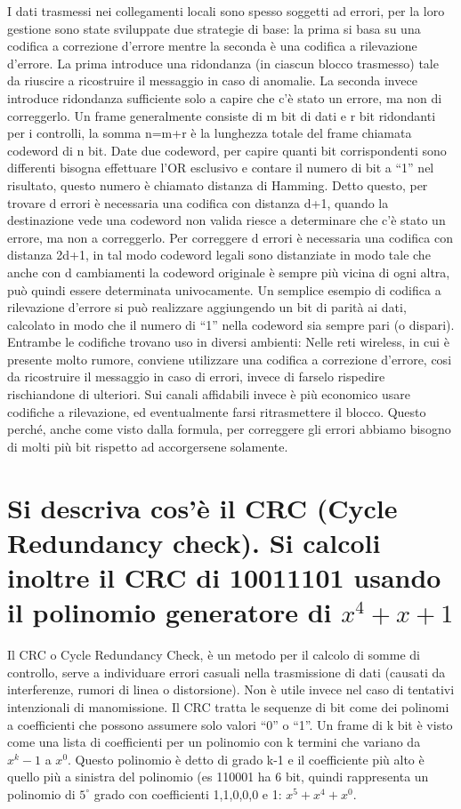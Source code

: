 I dati trasmessi nei collegamenti locali sono spesso soggetti ad errori, per la loro gestione sono state sviluppate due strategie di base: la prima si basa su una codifica a correzione d’errore mentre la seconda è una codifica a rilevazione d’errore.
La prima introduce una ridondanza (in ciascun blocco trasmesso) tale da riuscire a ricostruire il messaggio in caso di anomalie. La seconda invece introduce ridondanza sufficiente solo a capire che c’è stato un errore, ma non di correggerlo.
Un frame generalmente consiste di m bit di dati e r bit ridondanti per i controlli, la somma n=m+r è la lunghezza totale del frame chiamata codeword di n bit. Date due codeword, per capire quanti bit corrispondenti sono differenti bisogna effettuare l’OR esclusivo e contare il numero di bit a “1” nel risultato, questo numero è chiamato distanza di Hamming.
Detto questo, per trovare d errori è necessaria una codifica con distanza d+1, quando la destinazione vede una codeword non valida riesce a determinare che c’è stato un errore, ma non a correggerlo.
Per correggere d errori è necessaria una codifica con distanza 2d+1, in tal modo codeword legali sono distanziate in modo tale che anche con d cambiamenti la codeword originale è sempre più vicina di ogni altra, può quindi essere determinata univocamente.
Un semplice esempio di codifica a rilevazione d’errore si può realizzare aggiungendo un bit di parità ai dati, calcolato in modo che il numero di “1” nella codeword sia sempre pari (o dispari).
Entrambe le codifiche trovano uso in diversi ambienti:
Nelle reti wireless, in cui è presente molto rumore, conviene utilizzare una codifica a correzione d’errore, cosi da ricostruire il messaggio in caso di errori, invece di farselo rispedire rischiandone di ulteriori. 
Sui canali affidabili invece è più economico usare codifiche a rilevazione, ed eventualmente farsi ritrasmettere il blocco.
Questo perché, anche come visto dalla formula, per correggere gli errori abbiamo bisogno di molti più bit rispetto ad accorgersene solamente.

\section{Si descriva cos'è il CRC (Cycle Redundancy check). Si calcoli inoltre il CRC di 10011101 usando il polinomio generatore di $x^4+x+1$}

Il CRC o Cycle Redundancy Check, è un metodo per il calcolo di somme di controllo, serve a individuare errori casuali nella trasmissione di dati (causati da interferenze, rumori di linea o distorsione). Non è utile invece nel caso di tentativi intenzionali di manomissione.
Il CRC tratta le sequenze di bit come dei polinomi a coefficienti che possono assumere solo valori “0” o “1”. Un frame di k bit è visto come una lista di coefficienti per un polinomio con k termini che variano da $x^k-1$ a $x^0$. Questo polinomio è detto di grado k-1 e il coefficiente più alto è quello più a sinistra del polinomio (es 110001 ha 6 bit, quindi rappresenta un polinomio di $5^{\circ}$ grado con coefficienti 1,1,0,0,0 e 1: $x^5+x^4+x^0$.

